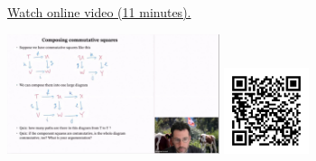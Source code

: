 
\begin{minipage}{10cm}
    \href{https://act4e-spring21.netlify.app/spring2021-nat-trafos:diagrams.html}{Watch online video (11 minutes).}
        
    \href{https://act4e-spring21.netlify.app/spring2021-nat-trafos:diagrams.html}{\includegraphics[height=3.5cm]{spring2021-nat-trafos:diagrams/thumbnails.jpg}}
    \href{https://act4e-spring21.netlify.app/spring2021-nat-trafos:diagrams.html}{\includegraphics[height=2.5cm]{spring2021-nat-trafos:diagrams/qrcode.png}}
\end{minipage}

